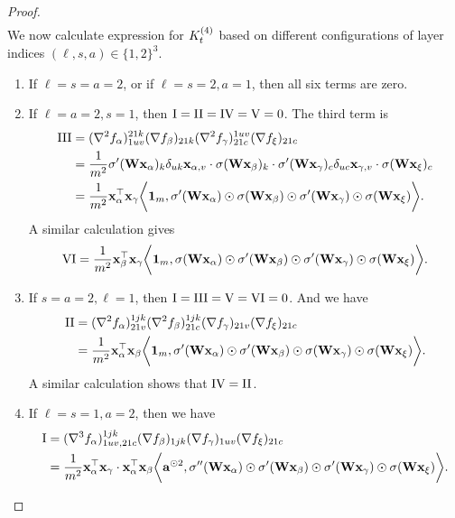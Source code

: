 \begin{proof}
\begin{align*}
	\end{align*}
	We now calculate expression for ${K}^{(4)}_t$ based on different configurations of layer indices $(\ell, s, a) \in \{1, 2\}^{3}$. 
	\begin{enumerate}[itemsep=0mm]
		\item If $\ell = s = a = {2}$, or if $\ell = s = 2, a = 1$, then all six terms are zero. 
		\item If $\ell = a = 2, s = 1$, then $\RN{1}=\RN{2}=\RN{4}=\RN{5} = 0$. The third term is
		\begin{align*}
			\RN{3} & = (\nabla^2 f_\alpha)^{21k}_{1uv} (\nabla f_\beta)_{21k} (\nabla^2 f_\gamma)^{1uv}_{21c} (\nabla f_\xi)_{21c} \\
			& = \frac{1}{m^2} \sigma'(\rmW \rvx_\alpha)_{k} \delta_{uk}\rvx_{\alpha, v} \cdot \sigma(\rmW \rvx_\beta)_k \cdot \sigma'(\rmW \rvx_\gamma)_c \delta_{uc}\rvx_{\gamma, v} \cdot \sigma(\rmW \rvx_\xi)_c \\
			& = \frac{1}{m^2}\rvx_\alpha^\top\rvx_\gamma \bigg\la\mathbf{1}_m, \sigma'(\rmW \rvx_\alpha) \odot \sigma(\rmW \rvx_\beta) \odot \sigma'(\rmW \rvx_\gamma) \odot \sigma(\rmW \rvx_\xi) \bigg\ra.
		\end{align*}
		A similar calculation gives
		\[
			\RN{6} = \frac{1}{m^2}\rvx_\beta^\top\rvx_\gamma \bigg\la\mathbf{1}_m, \sigma(\rmW \rvx_\alpha) \odot \sigma'(\rmW \rvx_\beta) \odot \sigma'(\rmW \rvx_\gamma) \odot \sigma(\rmW \rvx_\xi) \bigg\ra.
		\]
		\item If $s = a = 2, \ell = 1$, then $\RN{1}=\RN{3}=\RN{5} = \RN{6} = 0$. And we have
		\begin{align*}
			\RN{2} & = (\nabla^2 f_\alpha )^{1jk}_{21 v} (\nabla^2 f_\beta)^{1jk}_{21c} (\nabla f_\gamma)_{21 v} (\nabla f_\xi)_{21c} \\
			& = \frac{1}{m^2}\rvx_\alpha^\top\rvx_\beta \bigg\la\mathbf{1}_m, \sigma'(\rmW \rvx_\alpha) \odot \sigma'(\rmW \rvx_\beta) \odot \sigma(\rmW \rvx_\gamma) \odot \sigma(\rmW \rvx_\xi) \bigg\ra.
		\end{align*}
		A similar calculation shows that $\RN{4} = \RN{2}$.
		\item If $\ell = s = 1, a = 2$, then we have
		\begin{align*}
			\RN{1} & = (\nabla^3 f_\alpha)^{1jk}_{1uv, 21 c} (\nabla f_\beta)_{1jk} (\nabla f_\gamma)_{1uv} (\nabla f_\xi)_{21 c} \\
			& = \frac{1}{m^2}\rvx_\alpha^\top\rvx_\gamma \cdot\rvx_\alpha^\top\rvx_\beta \bigg\la\rva^{\odot 2} , \sigma''(\rmW \rvx_\alpha) \odot \sigma'(\rmW \rvx_\beta) \odot \sigma'(\rmW \rvx_\gamma) \odot \sigma(\rmW \rvx_\xi) \bigg\ra.

\end{align*}
\end{enumerate}
\end{proof}
